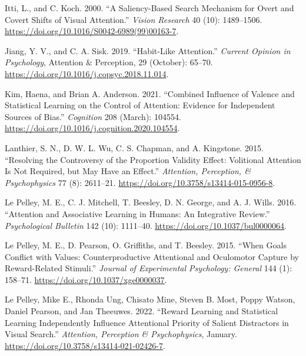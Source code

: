 \documentclass[11pt,halfline,a4paper,]{ouparticle}
\newlength{\cslhangindent}
\newenvironment{cslreferences}%
  {\setlength{\parindent}{0pt}%
  \everypar{\setlength{\hangindent}{\cslhangindent}}\ignorespaces}%
  {\par}
\begin{document}
\begin{cslreferences}
\leavevmode\hypertarget{ref-ittiSaliencybasedSearchMechanism2000}{}%
Itti, L., and C. Koch. 2000. ``A Saliency-Based Search Mechanism for Overt and Covert Shifts of Visual Attention.'' \emph{Vision Research} 40 (10): 1489--1506. \url{https://doi.org/10.1016/S0042-6989(99)00163-7}.

\leavevmode\hypertarget{ref-jiangHabitlikeAttention2019}{}%
Jiang, Y. V., and C. A. Sisk. 2019. ``Habit-Like Attention.'' \emph{Current Opinion in Psychology}, Attention \& Perception, 29 (October): 65--70. \url{https://doi.org/10.1016/j.copsyc.2018.11.014}.

\leavevmode\hypertarget{ref-kimCombinedInfluenceValence2021}{}%
Kim, Haena, and Brian A. Anderson. 2021. ``Combined Influence of Valence and Statistical Learning on the Control of Attention: Evidence for Independent Sources of Bias.'' \emph{Cognition} 208 (March): 104554. \url{https://doi.org/10.1016/j.cognition.2020.104554}.

\leavevmode\hypertarget{ref-lanthierResolvingControversyProportion2015}{}%
Lanthier, S. N., D. W. L. Wu, C. S. Chapman, and A. Kingstone. 2015. ``Resolving the Controversy of the Proportion Validity Effect: Volitional Attention Is Not Required, but May Have an Effect.'' \emph{Attention, Perception, \& Psychophysics} 77 (8): 2611--21. \url{https://doi.org/10.3758/s13414-015-0956-8}.

\leavevmode\hypertarget{ref-lepelleyAttentionAssociativeLearning2016a}{}%
Le Pelley, M. E., C. J. Mitchell, T. Beesley, D. N. George, and A. J. Wills. 2016. ``Attention and Associative Learning in Humans: An Integrative Review.'' \emph{Psychological Bulletin} 142 (10): 1111--40. \url{https://doi.org/10.1037/bul0000064}.

\leavevmode\hypertarget{ref-lepelleyWhenGoalsConflict2015}{}%
Le Pelley, M. E., D. Pearson, O. Griffiths, and T. Beesley. 2015. ``When Goals Conflict with Values: Counterproductive Attentional and Oculomotor Capture by Reward-Related Stimuli.'' \emph{Journal of Experimental Psychology: General} 144 (1): 158--71. \url{https://doi.org/10.1037/xge0000037}.

\leavevmode\hypertarget{ref-lepelleyRewardLearningStatistical2022}{}%
Le Pelley, Mike E., Rhonda Ung, Chisato Mine, Steven B. Most, Poppy Watson, Daniel Pearson, and Jan Theeuwes. 2022. ``Reward Learning and Statistical Learning Independently Influence Attentional Priority of Salient Distractors in Visual Search.'' \emph{Attention, Perception \& Psychophysics}, January. \url{https://doi.org/10.3758/s13414-021-02426-7}.


\end{cslreferences}
\end{document}
